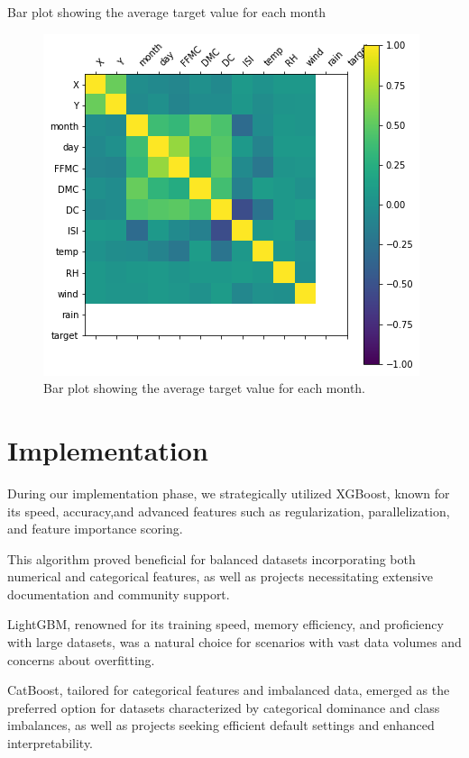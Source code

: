 \clearpage
Bar plot showing the average target value for each month
\begin{figure}[ht]
    \centering
    \includegraphics[scale=1.0]{figures/output_18_0.png}
    \caption{Bar plot showing the average target value for each month.}
    \label{fig:example-01}
\end{figure}

\clearpage
\section {Implementation}
During our implementation phase, we strategically utilized XGBoost, known for its speed, accuracy,and advanced features such as regularization, parallelization, and feature importance scoring. 

This algorithm proved beneficial for balanced datasets incorporating both numerical and categorical features, as well as projects necessitating extensive documentation and community support.

LightGBM, renowned for its training speed, memory efficiency, and proficiency with large datasets, was a natural choice for scenarios with vast data volumes and concerns about overfitting. 

CatBoost, tailored for categorical features and imbalanced data, emerged as the preferred option for datasets characterized by categorical dominance and class imbalances, as well as projects seeking
efficient default settings and enhanced interpretability.


